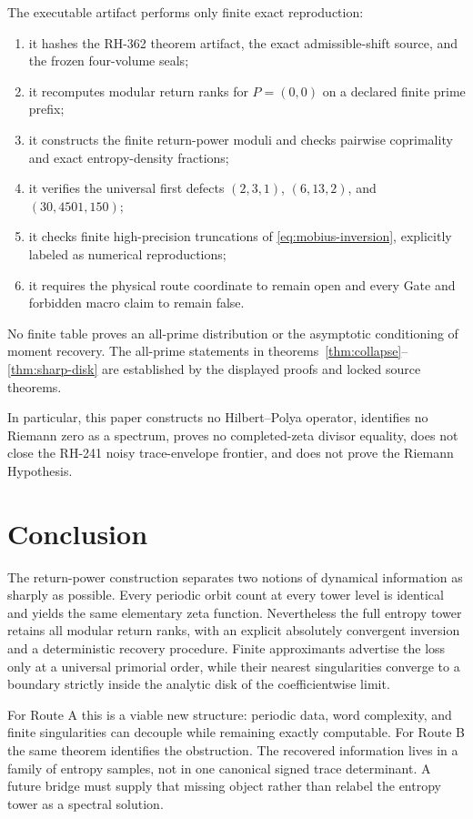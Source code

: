\documentclass[11pt]{article}
\numberwithin{equation}{section}
\theoremstyle{remark}
\begin{document}
The executable artifact performs only finite exact reproduction:
\begin{enumerate}
\item it hashes the RH-362 theorem artifact, the exact admissible-shift source,
and the frozen four-volume seals;
\item it recomputes modular return ranks for $P=(0,0)$ on a declared finite
prime prefix;
\item it constructs the finite return-power moduli and checks pairwise
coprimality and exact entropy-density fractions;
\item it verifies the universal first defects
\((2,3,1)\), \((6,13,2)\), and \((30,4501,150)\);
\item it checks finite high-precision truncations of
\eqref{eq:mobius-inversion}, explicitly labeled as numerical reproductions;
\item it requires the physical route coordinate to remain open and every
Gate and forbidden macro claim to remain false.
\end{enumerate}

No finite table proves an all-prime distribution or the asymptotic
conditioning of moment recovery.  The all-prime statements in
theorems~\ref{thm:collapse}--\ref{thm:sharp-disk} are established by the
displayed proofs and locked source theorems.

In particular, this paper constructs no Hilbert--Polya operator, identifies
no Riemann zero as a spectrum, proves no completed-zeta divisor equality,
does not close the RH-241 noisy trace-envelope frontier, and does not prove
the Riemann Hypothesis.

\section{Conclusion}

The return-power construction separates two notions of dynamical
information as sharply as possible.  Every periodic orbit count at every
tower level is identical and yields the same elementary zeta function.
Nevertheless the full entropy tower retains all modular return ranks, with
an explicit absolutely convergent inversion and a deterministic recovery
procedure.  Finite approximants advertise the loss only at a universal
primorial order, while their nearest singularities converge to a boundary
strictly inside the analytic disk of the coefficientwise limit.

For Route A this is a viable new structure: periodic data, word complexity,
and finite singularities can decouple while remaining exactly computable.
For Route B the same theorem identifies the obstruction.  The recovered
information lives in a family of entropy samples, not in one canonical
signed trace determinant.  A future bridge must supply that missing object
rather than relabel the entropy tower as a spectral solution.

\begingroup
\raggedright


\endgroup
\end{document}
